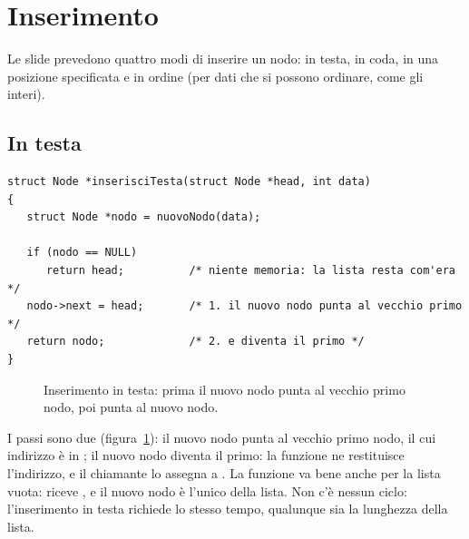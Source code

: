 \section{Inserimento}

Le slide prevedono quattro modi di inserire un nodo: in testa, in coda, in
una posizione specificata e in ordine (per dati che si possono ordinare,
come gli interi).

\subsection{In testa}

\begin{lstlisting}[style=c, name=lista.c]
struct Node *inserisciTesta(struct Node *head, int data)
{
   struct Node *nodo = nuovoNodo(data);

   if (nodo == NULL)
      return head;          /* niente memoria: la lista resta com'era */
   nodo->next = head;       /* 1. il nuovo nodo punta al vecchio primo */
   return nodo;             /* 2. e diventa il primo */
}
\end{lstlisting}

\begin{figure}[H]
  \centering
  \caption{Inserimento in testa: prima il nuovo nodo punta al vecchio primo
           nodo, poi  punta al nuovo nodo.}
  \label{fig:ins-testa}
\end{figure}

I passi sono due (figura~\ref{fig:ins-testa}):  il nuovo nodo
punta al vecchio primo nodo, il cui indirizzo è in ;
 il nuovo nodo diventa il primo: la funzione ne restituisce
l'indirizzo, e il chiamante lo assegna a . La funzione va bene
anche per la lista vuota:  riceve , e il nuovo
nodo è l'unico della lista. Non c'è nessun ciclo: l'inserimento in testa
richiede lo stesso tempo, qualunque sia la lunghezza della lista.

